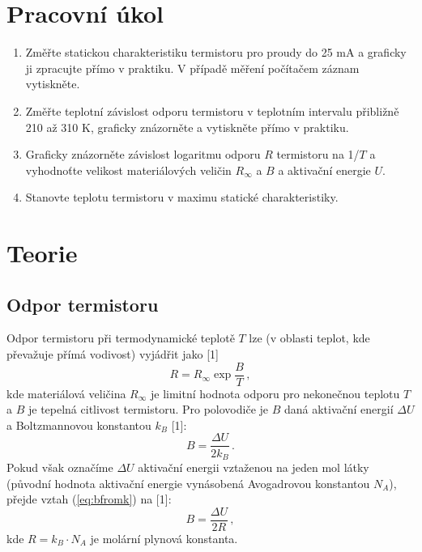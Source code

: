 \documentclass{../concepts/prepareprotokol} %
\begin{document}
\maketitle

\section{Pracovní úkol}
\begin{enumerate}
    \item Změřte statickou charakteristiku termistoru pro proudy do 25 mA a graficky ji zpracujte přímo v praktiku. V případě měření počítačem záznam vytiskněte.
    
    \item Změřte teplotní závislost odporu termistoru v teplotním intervalu přibližně 210 až 310 K, graficky znázorněte a vytiskněte přímo v praktiku.
    
    \item Graficky znázorněte závislost logaritmu odporu $R$ termistoru na 1/$T$ a vyhodnoťte velikost materiálových veličin $R_\infty$ a $B$ a aktivační energie $U$.
    
    \item Stanovte teplotu termistoru v maximu statické charakteristiky.
\end{enumerate}

\section{Teorie}
\subsection{Odpor termistoru}
Odpor termistoru při termodynamické teplotě $T$ lze (v oblasti teplot, kde převažuje přímá vodivost) vyjádřit jako [1]
\begin{equation} \label{eq:rexpt}
    R = R_\infty \exp{\frac{B}{T}} \, ,
\end{equation}
kde materiálová veličina $R_\infty$ je limitní hodnota odporu pro nekonečnou teplotu $T$ a $B$ je tepelná citlivost termistoru. Pro polovodiče je $B$ daná aktivační energií $\Delta U$ a Boltzmannovou konstantou $k_B$ [1]:
\begin{equation} \label{eq:bfromk}
    B = \frac{\Delta U}{2 k_B} \, .
\end{equation}
Pokud však označíme $\Delta U$ aktivační energii vztaženou na jeden mol látky (původní hodnota aktivační energie vynásobená Avogadrovou konstantou $N_A$), přejde vztah (\ref{eq:bfromk}) na [1]:
\begin{equation} \label{eq:bfromr}
    B = \frac{\Delta U}{2 R} \, ,
\end{equation}
kde $R = k_B \cdot N_A$ je molární plynová konstanta.
\end{document}
